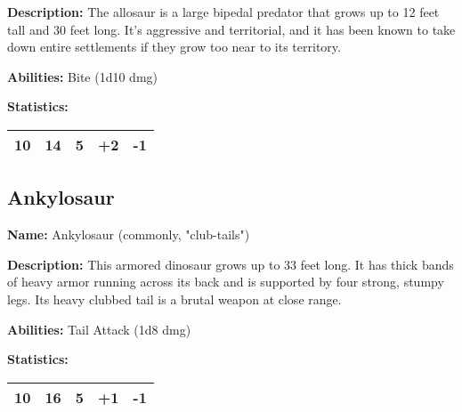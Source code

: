 \begin{multicols}{2}
\textbf{Description:} The allosaur is a large bipedal predator that grows up to
12 feet tall and 30 feet long. It's aggressive and territorial, and it has been
known to take down entire settlements if they grow too near to its territory.

\textbf{Abilities:} Bite (1d10 dmg)

\textbf{Statistics:}

\begin{center}
{
\begin{xtabular}{|l|l|l|l|l|}
10 & 14 & 5 & +2 & -1 \\
\hline
\end{xtabular}
}
\end{center}

\subsection{Ankylosaur}

\textbf{Name:} Ankylosaur (commonly, "club-tails") 

\textbf{Description:} This armored dinosaur grows up to 33 feet long. It has thick bands
of heavy armor running across its back and is supported by four strong, stumpy legs. Its
heavy clubbed tail is a brutal weapon at close range.

\textbf{Abilities:} Tail Attack (1d8 dmg)

\textbf{Statistics:}

\begin{center}
{
\begin{xtabular}{|l|l|l|l|l|}
10 & 16 & 5 & +1 & -1 \\
\hline
\end{xtabular}
}
\end{center}


\end{multicols}
